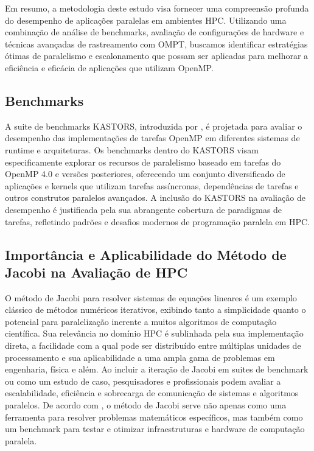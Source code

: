 \documentclass[ppgc,diss]{iiufrgs}
\begin{document}

Em resumo, a metodologia deste estudo visa fornecer uma compreensão profunda do desempenho de aplicações paralelas em ambientes HPC. Utilizando uma combinação de análise de benchmarks, avaliação de configurações de hardware e técnicas avançadas de rastreamento com OMPT, buscamos identificar estratégias ótimas de paralelismo e escalonamento que possam ser aplicadas para melhorar a eficiência e eficácia de aplicações que utilizam OpenMP.

\subsection{Benchmarks}

A suite de benchmarks KASTORS, introduzida por , é projetada para avaliar o desempenho das implementações de tarefas OpenMP em diferentes sistemas de runtime e arquiteturas. Os benchmarks dentro do KASTORS visam especificamente explorar os recursos de paralelismo baseado em tarefas do OpenMP 4.0 e versões posteriores, oferecendo um conjunto diversificado de aplicações e kernels que utilizam tarefas assíncronas, dependências de tarefas e outros construtos paralelos avançados. A inclusão do KASTORS na avaliação de desempenho é justificada pela sua abrangente cobertura de paradigmas de tarefas, refletindo padrões e desafios modernos de programação paralela em HPC.

\subsection{Importância e Aplicabilidade do Método de Jacobi na Avaliação de HPC}
O método de Jacobi para resolver sistemas de equações lineares é um exemplo clássico de métodos numéricos iterativos, exibindo tanto a simplicidade quanto o potencial para paralelização inerente a muitos algoritmos de computação científica. Sua relevância no domínio HPC é sublinhada pela sua implementação direta, a facilidade com a qual pode ser distribuído entre múltiplas unidades de processamento e sua aplicabilidade a uma ampla gama de problemas em engenharia, física e além. Ao incluir a iteração de Jacobi em suites de benchmark ou como um estudo de caso, pesquisadores e profissionais podem avaliar a escalabilidade, eficiência e sobrecarga de comunicação de sistemas e algoritmos paralelos. De acordo com , o método de Jacobi serve não apenas como uma ferramenta para resolver problemas matemáticos específicos, mas também como um benchmark para testar e otimizar infraestruturas e hardware de computação paralela.
\end{document}
